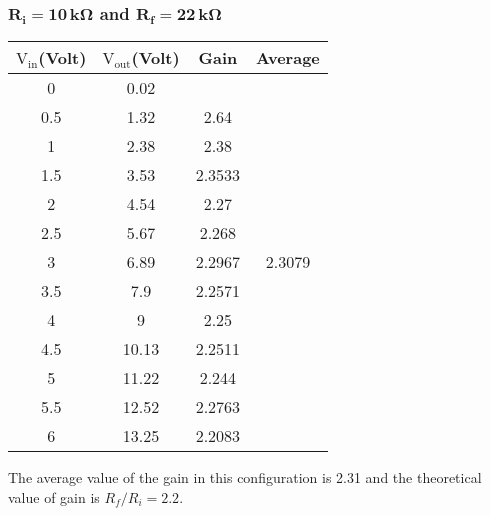 \documentclass[12pt]{article}
\begin{document}
\subsubsection{$\mathbf{R_i = 10\, k \Omega}$ and $\mathbf{R_f = 22\, k \Omega}$}
\begin{table}[H]
	\centering
	\begin{tabular}{|c|c|c|c|}
		\hline
		$\mathrm{V_{in}}$(Volt) & $\mathrm{V_{out}}$(Volt) & Gain             & Average                            \\ \hline \hline
		0			 &0.02			&					& \multirow{13}{*}{2.3079} \\ \cline{1-3}
		0.5          & 1.32          & 2.64             & 						   \\ \cline{1-3}
		1            & 2.38          & 2.38             &                          \\ \cline{1-3}
		1.5          & 3.53          & 2.3533 			&                          \\ \cline{1-3}
		2            & 4.54          & 2.27             &                          \\ \cline{1-3}
		2.5          & 5.67          & 2.268            &                          \\ \cline{1-3}
		3            & 6.89          & 2.2967 			&                          \\ \cline{1-3}
		3.5          & 7.9           & 2.2571			&                          \\ \cline{1-3}
		4            & 9             & 2.25             &                          \\ \cline{1-3}
		4.5          & 10.13         & 2.2511		    &                          \\ \cline{1-3}
		5            & 11.22         & 2.244            &                          \\ \cline{1-3}
		5.5          & 12.52         & 2.2763 			&                          \\ \cline{1-3}
		6            & 13.25         & 2.2083 			&                          \\ \hline
	\end{tabular}
\end{table}
The average value of the gain in this configuration is 2.31 and the theoretical value of gain is $ R_f/ R_i = 2.2 $. 
\end{document}
